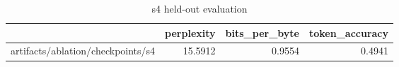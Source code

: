\begin{table}[t]
\centering
\begin{tabular}{lrrr}
\toprule
 & perplexity & bits\_per\_byte & token\_accuracy \\
\midrule
artifacts/ablation/checkpoints/s4 & 15.5912 & 0.9554 & 0.4941 \\
\bottomrule
\end{tabular}
\caption{s4 held-out evaluation}
\label{tab:s4-eval}
\end{table}
